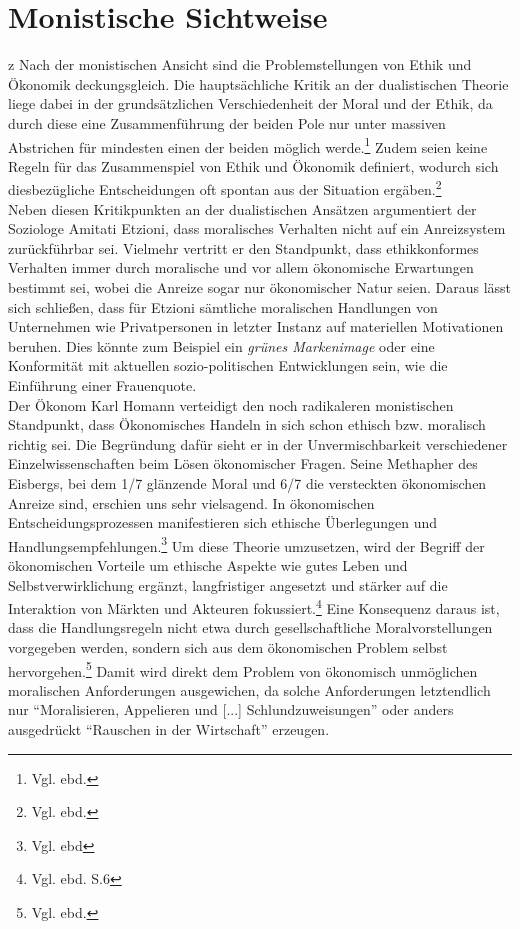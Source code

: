 \documentclass[12pt]{article}
\begin{document}
\section{Monistische Sichtweise}z
Nach der monistischen Ansicht sind die Problemstellungen von Ethik und Ökonomik deckungsgleich. Die hauptsächliche Kritik an der dualistischen Theorie liege dabei in der grundsätzlichen Verschiedenheit der Moral und der Ethik, da durch diese eine Zusammenführung der beiden Pole nur unter massiven Abstrichen für mindesten einen der beiden möglich werde.\footnote{Vgl. ebd.}\setlength{\footnotemargin}{5mm} Zudem seien keine Regeln für das Zusammenspiel von Ethik und Ökonomik definiert, wodurch sich diesbezügliche Entscheidungen oft spontan aus der Situation ergäben.\footnote{Vgl. ebd.}
\\
Neben diesen Kritikpunkten an der dualistischen Ansätzen argumentiert der Soziologe Amitati Etzioni, dass moralisches Verhalten nicht auf ein Anreizsystem zurückführbar sei. Vielmehr vertritt er den Standpunkt, dass ethikkonformes Verhalten immer durch moralische und vor allem ökonomische Erwartungen bestimmt sei, wobei die Anreize sogar nur ökonomischer Natur seien. Daraus lässt sich schließen, dass für Etzioni sämtliche moralischen Handlungen von Unternehmen wie Privatpersonen in letzter Instanz auf materiellen Motivationen beruhen. Dies könnte zum Beispiel ein \textit{grünes Markenimage} oder eine Konformität mit aktuellen sozio-politischen Entwicklungen sein, wie die Einführung einer Frauenquote.
\\
Der Ökonom Karl Homann verteidigt den noch radikaleren monistischen Standpunkt, dass Ökonomisches Handeln in sich schon ethisch bzw. moralisch richtig sei. Die Begründung dafür sieht er in der Unvermischbarkeit verschiedener Einzelwissenschaften beim Lösen ökonomischer Fragen. Seine Methapher des Eisbergs, bei dem 1/7 glänzende Moral und 6/7 die versteckten ökonomischen Anreize sind, erschien uns sehr vielsagend. In ökonomischen Entscheidungsprozessen manifestieren sich ethische Überlegungen und Handlungsempfehlungen.\footnote{Vgl. ebd} Um diese Theorie umzusetzen, wird der Begriff der ökonomischen Vorteile um ethische Aspekte wie gutes Leben und Selbstverwirklichung ergänzt, langfristiger angesetzt und stärker auf die Interaktion von Märkten und Akteuren fokussiert.\footnote{Vgl. ebd. S.6} Eine Konsequenz daraus ist, dass die Handlungsregeln nicht etwa durch gesellschaftliche Moralvorstellungen vorgegeben werden, sondern sich aus dem ökonomischen Problem selbst hervorgehen.\footnote{Vgl. ebd.} Damit wird direkt dem Problem von ökonomisch unmöglichen moralischen Anforderungen ausgewichen, da solche Anforderungen letztendlich nur “Moralisieren, Appelieren und [...] Schlundzuweisungen” oder anders ausgedrückt “Rauschen in der Wirtschaft” erzeugen.
\end{document}
